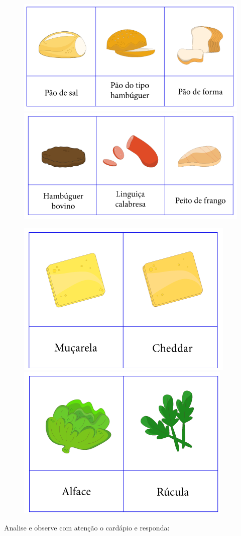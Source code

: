 \pagebreak

\begin{figure}[htpb!]
\includegraphics[width=.5\textwidth]{../ilustracoes/MAT5/SAEB_5ANO_MAT_figura81a.png}
\includegraphics[width=.5\textwidth]{../ilustracoes/MAT5/SAEB_5ANO_MAT_figura81b.png}
\end{figure}


\begin{figure}[htpb!]
\includegraphics[width=.5\textwidth]{../ilustracoes/MAT5/SAEB_5ANO_MAT_figura81c.png}
\includegraphics[width=.5\textwidth]{../ilustracoes/MAT5/SAEB_5ANO_MAT_figura81d.png}
\end{figure}

Analise e observe com atenção o cardápio e responda:

